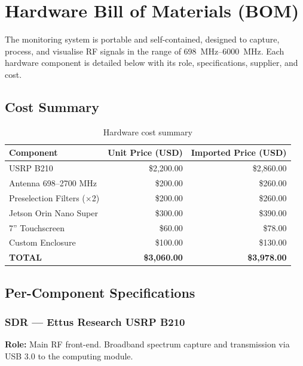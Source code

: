 \documentclass[12pt,a4paper]{article}
\begin{document}
\section{Hardware Bill of Materials (BOM)}

The monitoring system is portable and self-contained, designed to capture, process, and visualise RF signals in the range of \qtyrange{698}{6000}{\MHz}. Each hardware component is detailed below with its role, specifications, supplier, and cost.

\subsection{Cost Summary}

\begin{table}[H]
\centering
\caption{Hardware cost summary}
\label{tab:cost}
\begin{tabular}{@{}lrr@{}}
\toprule
\textbf{Component} & \textbf{Unit Price (USD)} & \textbf{Imported Price (USD)} \\
\midrule
USRP B210 & \$2,200.00 & \$2,860.00 \\
Antenna 698--2700 MHz & \$200.00   & \$260.00   \\
Preselection Filters ($\times$2) & \$200.00   & \$260.00   \\
Jetson Orin Nano Super & \$300.00   & \$390.00   \\
7'' Touchscreen & \$60.00    & \$78.00    \\
Custom Enclosure & \$100.00   & \$130.00   \\
\midrule
\textbf{TOTAL} & \textbf{\$3,060.00} & \textbf{\$3,978.00} \\
\bottomrule
\end{tabular}
\end{table}

\subsection{Per-Component Specifications}

\subsubsection{SDR --- Ettus Research USRP B210}

\textbf{Role:} Main RF front-end. Broadband spectrum capture and transmission via USB 3.0 to the computing module.
\end{document}
